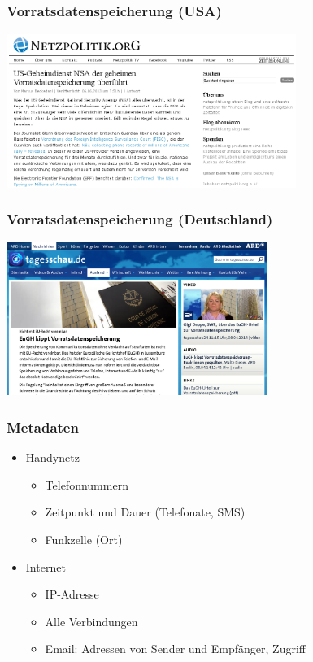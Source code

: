 \documentclass[12pt]{beamer}
\begin{document}
\subsection{}

\begin{frame}
  \frametitle{Vorratsdatenspeicherung (USA)}
    \begin{center}
      \includegraphics[height=5cm]{img/netzpolitik-verizon.png}
    \end{center}
\end{frame}

\begin{frame}
  \frametitle{Vorratsdatenspeicherung (Deutschland)}
    \begin{center}
      \includegraphics[height=5cm]{img/tagesschau-vds.png}
    \end{center}
\end{frame}

\begin{frame}
  \frametitle{Metadaten}
  \begin{itemize}
    \item Handynetz
      \begin{itemize}
        \item Telefonnummern
        \item Zeitpunkt und Dauer (Telefonate, SMS)
        \item Funkzelle (Ort)
      \end{itemize}
    \item Internet
      \begin{itemize}
        \item IP-Adresse
        \item Alle Verbindungen
        \item Email: Adressen von Sender und Empfänger, Zugriff
      \end{itemize}
  \end{itemize}
\end{frame}
\end{document}
